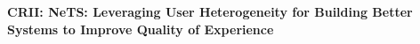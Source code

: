 \documentclass{proposalnsf}
\begin{document}





\begin{center}
{\bf\Large CRII: NeTS: Leveraging User Heterogeneity for Building Better \\Systems to Improve Quality of Experience} \\
\smallskip
\end{center}
\end{document}
